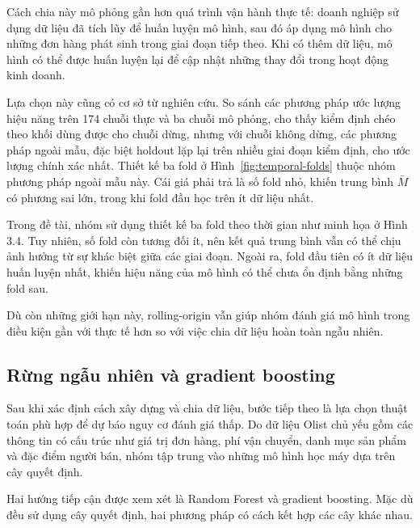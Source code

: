 \documentclass[12pt,a4paper]{report}
\begin{document}
Cách chia này mô phỏng gần hơn quá trình vận hành thực tế: doanh nghiệp sử dụng dữ liệu đã tích lũy để huấn luyện mô hình, sau đó áp dụng mô hình cho những đơn hàng phát sinh trong giai đoạn tiếp theo. Khi có thêm dữ liệu, mô hình có thể được huấn luyện lại để cập nhật những thay đổi trong hoạt động kinh doanh.

Lựa chọn này cũng có cơ sở từ nghiên cứu. So sánh các phương pháp ước lượng hiệu năng trên 174 chuỗi thực và ba chuỗi mô phỏng, \textcite{cerqueira2020} cho thấy kiểm định chéo theo khối dùng được cho chuỗi dừng, nhưng với chuỗi không dừng, các phương pháp ngoài mẫu, đặc biệt holdout lặp lại trên nhiều giai đoạn kiểm định, cho ước lượng chính xác nhất. Thiết kế ba fold ở Hình~\ref{fig:temporal-folds} thuộc nhóm phương pháp ngoài mẫu này. Cái giá phải trả là số fold nhỏ, khiến trung bình $\bar M$ có phương sai lớn, trong khi fold đầu học trên ít dữ liệu nhất.

Trong đề tài, nhóm sử dụng thiết kế ba fold theo thời gian như minh họa ở Hình 3.4. Tuy nhiên, số fold còn tương đối ít, nên kết quả trung bình vẫn có thể chịu ảnh hưởng từ sự khác biệt giữa các giai đoạn. Ngoài ra, fold đầu tiên có ít dữ liệu huấn luyện nhất, khiến hiệu năng của mô hình có thể chưa ổn định bằng những fold sau.

Dù còn những giới hạn này, rolling-origin vẫn giúp nhóm đánh giá mô hình trong điều kiện gần với thực tế hơn so với việc chia dữ liệu hoàn toàn ngẫu nhiên.

\subsection{Rừng ngẫu nhiên và gradient boosting}\label{sec:th-trees}

Sau khi xác định cách xây dựng và chia dữ liệu, bước tiếp theo là lựa chọn thuật toán phù hợp để dự báo nguy cơ đánh giá thấp. Do dữ liệu Olist chủ yếu gồm các thông tin có cấu trúc như giá trị đơn hàng, phí vận chuyển, danh mục sản phẩm và đặc điểm người bán, nhóm tập trung vào những mô hình học máy dựa trên cây quyết định.

Hai hướng tiếp cận được xem xét là Random Forest và gradient boosting. Mặc dù đều sử dụng cây quyết định, hai phương pháp có cách kết hợp các cây khác nhau.
\end{document}
